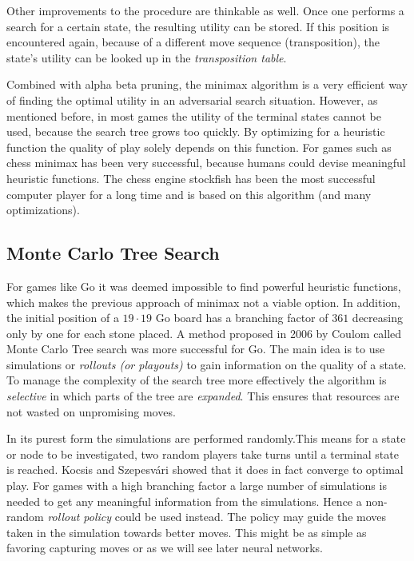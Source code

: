 Other improvements to the procedure are thinkable as well. Once one performs a search for a certain state, the resulting utility can be stored. If this position is encountered again, because of a different move sequence (transposition), the state's utility can be looked up in the \textit{transposition table}.

Combined with alpha beta pruning, the minimax algorithm is a very efficient way of finding the optimal utility in an adversarial search situation. However, as mentioned before, in most games the utility of the terminal states cannot be used, because the search tree grows too quickly. By optimizing for a heuristic function the quality of play solely depends on this function. For games such as chess minimax has been very successful, because humans could devise meaningful heuristic functions. The chess engine stockfish has been the most successful computer player for a long time and is based on this algorithm (and many optimizations). \cite{noauthor_stockfish_2021, noauthor_stockfish_nodate}

\subsection{Monte Carlo Tree Search}
For games like Go it was deemed impossible to find powerful heuristic functions, which makes the previous approach of minimax not a viable option. In addition, the initial position of a $19 \cdot 19$ Go board has a branching factor of $361$ decreasing only by one for each stone placed. A method proposed in 2006 by Coulom \cite{coulom_efficient_2007} called Monte Carlo Tree search was more successful for Go. The main idea is to use simulations or \textit{rollouts (or playouts)} to gain information on the quality of a state. To manage the complexity of the search tree more effectively the algorithm is \textit{selective} in which parts of the tree are \textit{expanded}. This ensures that resources are not wasted on unpromising moves.

In its purest form the simulations are performed randomly.This means for a state or node to be investigated, two random players take turns until a terminal state is reached. Kocsis and Szepesvári \cite{kocsis_bandit_2006} showed that it does in fact converge to optimal play. For games with a high branching factor a large number of simulations is needed to get any meaningful information from the simulations. Hence a non-random \textit{rollout policy} could be used instead. The policy may guide the moves taken in the simulation towards better moves. This might be as simple as favoring capturing moves or as we will see later neural networks.

